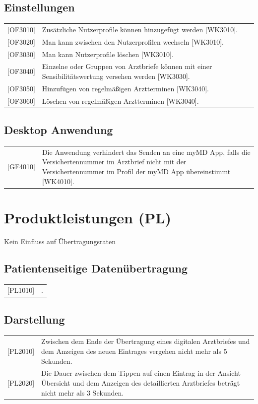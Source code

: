 \documentclass[a4paper]{scrreprt}
\begin{document}
\subsection{Einstellungen}
\begin{tabular}{lll}
[OF3010] &  \multicolumn{2}{p{12cm}}{Zusätzliche Nutzerprofile können hinzugefügt werden [WK3010].}\\
{[OF3020]} &  \multicolumn{2}{p{12cm}}{Man kann zwischen den Nutzerprofilen wechseln [WK3010].}\\
{[OF3030]} &  \multicolumn{2}{p{12cm}}{Man kann Nutzerprofile löschen [WK3010].}\\
{[OF3040]} &  \multicolumn{2}{p{12cm}}{Einzelne oder Gruppen von Arztbriefe können mit einer Sensibilitätswertung versehen werden [WK3030].}  \\
{[OF3050]} &  \multicolumn{2}{p{12cm}}{Hinzufügen von regelmäßigen Arztterminen [WK3040].}  \\
{[OF3060]} &  \multicolumn{2}{p{12cm}}{Löschen von regelmäßigen Arztterminen [WK3040].}  \\
\end{tabular}

\subsection{Desktop Anwendung}
\begin{tabular}{lll}
{[GF4010]}&  \multicolumn{2}{p{12cm}}{Die Anwendung verhindert das Senden an eine myMD \gls{App}, falls die Versichertennummer im Arztbrief nicht mit der Versichertennummer im Profil der myMD App übereinstimmt [WK4010].}\\
\end{tabular}


\section{Produktleistungen (PL)}
Kein Einfluss auf Übertragungsraten
\subsection{Patientenseitige Datenübertragung}
\begin{tabular}{lll}
[PL1010]&  \multicolumn{2}{p{12cm}}{.}\\

\end{tabular}

\subsection{Darstellung}
\begin{tabular}{lll}
[PL2010]&  \multicolumn{2}{p{12cm}}{Zwischen dem Ende der Übertragung eines digitalen Arztbriefes und dem Anzeigen des neuen Eintrages vergehen nicht mehr als 5 Sekunden.}\\
{[PL2020]}&  \multicolumn{2}{p{12cm}}{Die Dauer zwischen dem Tippen auf einen Eintrag in der Ansicht Übersicht und dem Anzeigen des detaillierten Arztbriefes beträgt nicht mehr als 3 Sekunden.}\\

\end{tabular}
\end{document}
